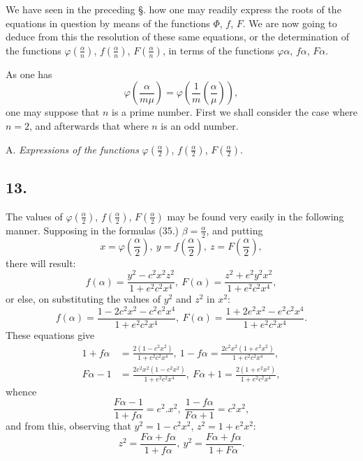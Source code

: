 \documentclass{article}
\begin{document}
We have seen in the preceding §. how one may readily express the roots of the equations in question by means of the functions $\Phi$, $f$, $F$. We are now going to deduce from this the resolution of these same equations, or the determination of the functions $\varphi\left(\frac{\alpha}{n}\right)$, $f\left(\frac{\alpha}{n}\right)$, $F\left(\frac{\alpha}{n}\right)$, in terms of the functions $\varphi\alpha$, $f\alpha$, $F\alpha$.


As one has
\[ \varphi\left(\frac{\alpha}{m\mu}\right)=\varphi\left(\frac{1}{m}\left(\frac{\alpha}{\mu}\right)\right), \]
one may suppose that $n$ is a prime number. First we shall consider the case where $n=2$, and afterwards that where $n$ is an odd number.

A. \emph{Expressions of the functions} $\varphi\left(\frac{\alpha}{2}\right)$, $f\left(\frac{\alpha}{2}\right)$, $F\left(\frac{\alpha}{2}\right)$.

\subsection*{13.}

The values of $\varphi\left(\frac{\alpha}{2}\right)$, $f\left(\frac{\alpha}{2}\right)$, $F\left(\frac{\alpha}{2}\right)$ may be found very easily in the following manner. Supposing in the formulas (35.) $\beta=\frac{\alpha}{2}$, and putting
\[ x=\varphi\left(\frac{\alpha}{2}\right),\ y=f\left(\frac{\alpha}{2}\right),\ z=F\left(\frac{\alpha}{2}\right), \]
there will result:
\[ f(\alpha)=\frac{y^{2}-c^{2}x^{2}z^{2}}{1+e^{2}c^{2}x^{4}},\ F(\alpha)=\frac{z^{2}+e^{2}y^{2}x^{2}}{1+e^{2}c^{2}x^{4}}, \]
or else, on substituting the values of $y^{2}$ and $z^{2}$ in $x^{2}$:
\[ f(\alpha)=\frac{1-2c^{2}x^{2}-c^{2}e^{2}x^{4}}{1+e^{2}c^{2}x^{4}},\ F(\alpha)=\frac{1+2e^{2}x^{2}-e^{2}c^{2}x^{4}}{1+e^{2}c^{2}x^{4}}. \]
These equations give
\[ \begin{aligned}
1+f\alpha&=\frac{2(1-c^{2}x^{2})}{1+e^{2}c^{2}x^{4}},\ 1-f\alpha=\frac{2c^{2}x^{2}(1+e^{2}x^{2})}{1+e^{2}c^{2}x^{4}},\\
F\alpha-1&=\frac{2e^{2}x^{2}(1-c^{2}x^{2})}{1+e^{2}c^{2}x^{4}},\ F\alpha+1=\frac{2(1+e^{2}x^{2})}{1+e^{2}c^{2}x^{4}},
\end{aligned} \]
whence
\[ \frac{F\alpha-1}{1+f\alpha}=e^{2}.x^{2},\ \frac{1-f\alpha}{F\alpha+1}=c^{2}x^{2}, \]
and from this, observing that $y^{2}=1-c^{2}x^{2}$, $z^{2}=1+e^{2}x^{2}$:
\[ z^{2}=\frac{F\alpha+f\alpha}{1+f\alpha},\ y^{2}=\frac{F\alpha+f\alpha}{1+F\alpha}. \]
\end{document}
